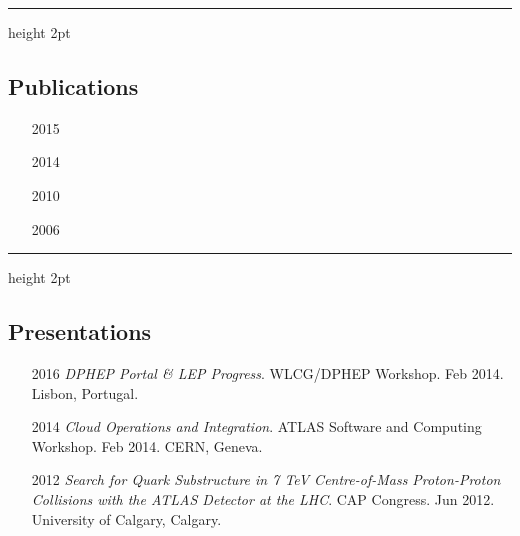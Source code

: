 \documentclass[12pt,a4paper]{article}
\newcommand{\colorrule}[1]
{
  {\color{#1}\hrule height 2pt}
  \vspace{1.0em}
}
\begin{document}
\colorrule{NavyBlue}
\subsection*{Publications}

%
\begin{itemize}
	\item[2015] 
	\item[2014] 
	\item[2010] 
	\item[2006] 
\end{itemize}


\colorrule{NavyBlue}
\subsection*{Presentations}
\begin{itemize}
	\item[2016] \emph{DPHEP Portal \& LEP Progress}. WLCG/DPHEP Workshop.  Feb
		2014. Lisbon, Portugal.
	\item[2014] \emph{Cloud Operations and Integration}. ATLAS Software and
		Computing Workshop. Feb 2014. CERN, Geneva.
	\item[2012] \emph{Search for Quark Substructure in 7 TeV Centre-of-Mass
		Proton-Proton Collisions with the ATLAS Detector at the LHC}. CAP Congress.
		Jun 2012. University of Calgary, Calgary.
\end{itemize}
\end{document}
